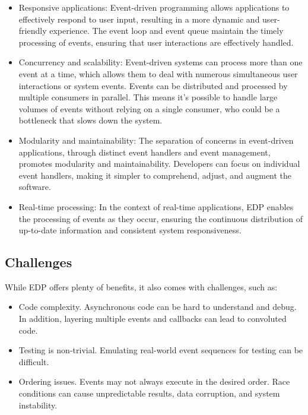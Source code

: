 \documentclass[twocolumn]{article}
\begin{document}
\begin{itemize}
     \item Responsive applications: Event-driven programming allows applications to effectively respond to user input, resulting in a more dynamic and user-friendly experience. The event loop and event queue maintain the timely processing of events, ensuring that user interactions are effectively handled. \cite{studysmarterEventDriven}
     \item Concurrency and scalability: Event-driven systems can process more than one event at a time, which allows them to deal with numerous simultaneous user interactions or system events. Events can be distributed and processed by multiple consumers in parallel. This means it’s possible to handle large volumes of events without relying on a single consumer, who could be a bottleneck that slows down the system. \cite{quixWhatEventdriven}
     \item Modularity and maintainability: The separation of concerns in event-driven applications, through distinct event handlers and event management, promotes modularity and maintainability. Developers can focus on individual event handlers, making it simpler to comprehend, adjust, and augment the software. \cite{studysmarterEventDriven}
     \item Real-time processing: In the context of real-time applications, EDP enables the processing of events as they occur, ensuring the continuous distribution of up-to-date information and consistent system responsiveness. \cite{studysmarterEventDriven}
\end{itemize}

\subsection*{Challenges}

While EDP offers plenty of benefits, it also comes with challenges, such as:

\begin{itemize}
     \item Code complexity. Asynchronous code can be hard to understand and debug. In addition, layering multiple events and callbacks can lead to convoluted code. \cite{quixWhatEventdriven}
     \item Testing is non-trivial. Emulating real-world event sequences for testing can be difficult. \cite{quixWhatEventdriven}
     \item Ordering issues. Events may not always execute in the desired order. Race conditions can cause unpredictable results, data corruption, and system instability. \cite{quixWhatEventdriven}
\end{itemize}
\end{document}
